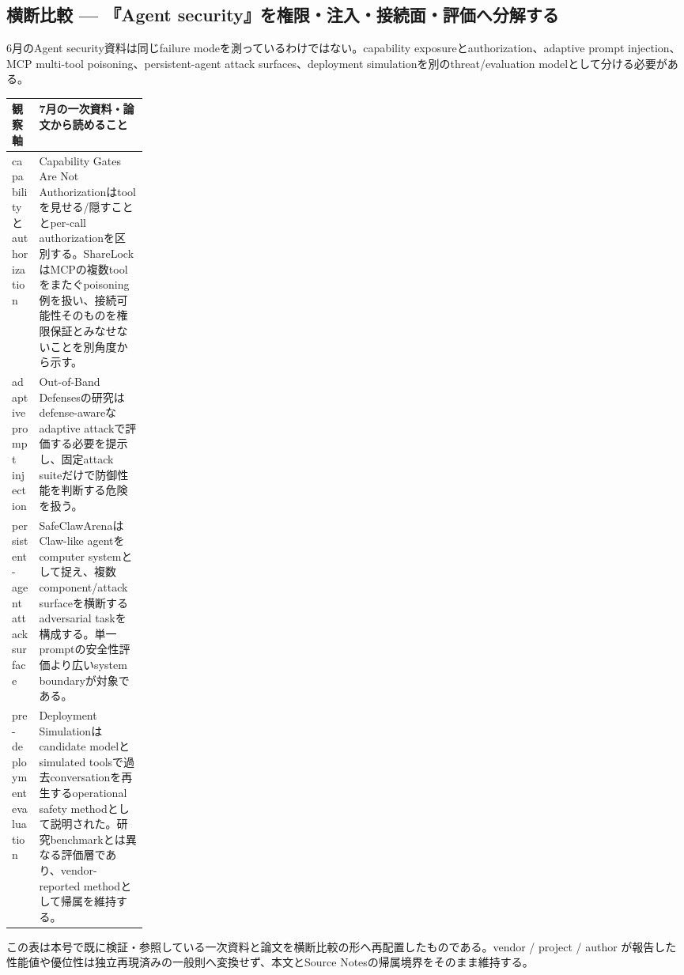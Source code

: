 \subsection*{横断比較 — 『Agent security』を権限・注入・接続面・評価へ分解する}
6月のAgent security資料は同じfailure modeを測っているわけではない。capability exposureとauthorization、adaptive prompt injection、MCP multi-tool poisoning、persistent-agent attack surfaces、deployment simulationを別のthreat/evaluation modelとして分ける必要がある。
\medskip
\begin{center}
\small
\renewcommand{\arraystretch}{1.16}
\begin{tabularx}{\linewidth}{@{}p{0.20\linewidth}X@{}}
\toprule
観察軸 & 7月の一次資料・論文から読めること \\
\midrule
capabilityとauthorization & Capability Gates Are Not Authorizationはtoolを見せる/隠すこととper-call authorizationを区別する。ShareLockはMCPの複数toolをまたぐpoisoning例を扱い、接続可能性そのものを権限保証とみなせないことを別角度から示す。 \cite{src-02da0db00c2d,src-91b06074799d} \\
adaptive prompt injection & Out-of-Band Defensesの研究はdefense-awareなadaptive attackで評価する必要を提示し、固定attack suiteだけで防御性能を判断する危険を扱う。 \cite{src-cd4b60edfee7} \\
persistent-agent attack surface & SafeClawArenaはClaw-like agentをcomputer systemとして捉え、複数component/attack surfaceを横断するadversarial taskを構成する。単一promptの安全性評価より広いsystem boundaryが対象である。 \cite{src-6da0c5a88fa4} \\
pre-deployment evaluation & Deployment Simulationはcandidate modelとsimulated toolsで過去conversationを再生するoperational safety methodとして説明された。研究benchmarkとは異なる評価層であり、vendor-reported methodとして帰属を維持する。 \cite{src-c000018ba1f0} \\
\bottomrule
\end{tabularx}
\renewcommand{\arraystretch}{1.0}
\end{center}
\normalsize
\begin{claimboundary}[この比較の境界]
この表は本号で既に検証・参照している一次資料と論文を横断比較の形へ再配置したものである。vendor / project / author が報告した性能値や優位性は独立再現済みの一般則へ変換せず、本文とSource Notesの帰属境界をそのまま維持する。
\end{claimboundary}
